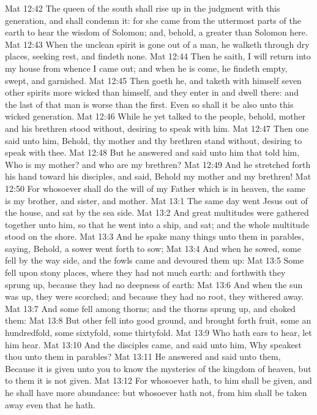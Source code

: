 \vs Mat 12:42 The queen of the south shall rise up in the judgment with this generation, and shall condemn it: for she came from the uttermost parts of the earth to hear the wisdom of Solomon; and, behold, a greater than Solomon  here.
\vs Mat 12:43 When the unclean spirit is gone out of a man, he walketh through dry places, seeking rest, and findeth none.
\vs Mat 12:44 Then he saith, I will return into my house from whence I came out; and when he is come, he findeth  empty, swept, and garnished.
\vs Mat 12:45 Then goeth he, and taketh with himself seven other spirits more wicked than himself, and they enter in and dwell there: and the last  of that man is worse than the first. Even so shall it be also unto this wicked generation.
\vs Mat 12:46 While he yet talked to the people, behold,  mother and his brethren stood without, desiring to speak with him.
\vs Mat 12:47 Then one said unto him, Behold, thy mother and thy brethren stand without, desiring to speak with thee.
\vs Mat 12:48 But he answered and said unto him that told him, Who is my mother? and who are my brethren?
\vs Mat 12:49 And he stretched forth his hand toward his disciples, and said, Behold my mother and my brethren!
\vs Mat 12:50 For whosoever shall do the will of my Father which is in heaven, the same is my brother, and sister, and mother.
\vs Mat 13:1 The same day went Jesus out of the house, and sat by the sea side.
\vs Mat 13:2 And great multitudes were gathered together unto him, so that he went into a ship, and sat; and the whole multitude stood on the shore.
\vs Mat 13:3 And he spake many things unto them in parables, saying, Behold, a sower went forth to sow;
\vs Mat 13:4 And when he sowed, some  fell by the way side, and the fowls came and devoured them up:
\vs Mat 13:5 Some fell upon stony places, where they had not much earth: and forthwith they sprung up, because they had no deepness of earth:
\vs Mat 13:6 And when the sun was up, they were scorched; and because they had no root, they withered away.
\vs Mat 13:7 And some fell among thorns; and the thorns sprung up, and choked them:
\vs Mat 13:8 But other fell into good ground, and brought forth fruit, some an hundredfold, some sixtyfold, some thirtyfold.
\vs Mat 13:9 Who hath ears to hear, let him hear.
\vs Mat 13:10 And the disciples came, and said unto him, Why speakest thou unto them in parables?
\vs Mat 13:11 He answered and said unto them, Because it is given unto you to know the mysteries of the kingdom of heaven, but to them it is not given.
\vs Mat 13:12 For whosoever hath, to him shall be given, and he shall have more abundance: but whosoever hath not, from him shall be taken away even that he hath.
